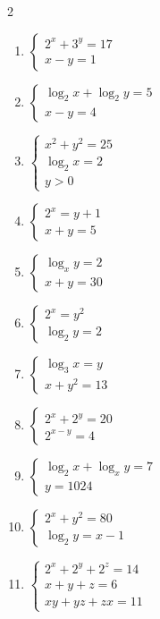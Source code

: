 \documentclass[12pt,a4paper]{article}
\begin{document}
\begin{multicols}{2}
\begin{enumerate}[leftmargin=*, itemsep=6pt]
\item \(\begin{cases}2^x+3^y=17\\ x-y=1\end{cases}\)

\item \(\begin{cases}\log_2x+\log_2y=5\\ x-y=4\end{cases}\)

\item \(\begin{cases}x^2+y^2=25\\ \log_2x=2\\ y>0\end{cases}\)

\item \(\begin{cases}2^x=y+1\\ x+y=5\end{cases}\)

\item \(\begin{cases}\log_xy=2\\ x+y=30\end{cases}\)

\item \(\begin{cases}2^x=y^2\\ \log_2y=2\end{cases}\)

\item \(\begin{cases}\log_3x=y\\ x+y^2=13\end{cases}\)

\item \(\begin{cases}2^x+2^y=20\\ 2^{x-y}=4\end{cases}\)

\item \(\begin{cases}\log_2x+\log_xy=7\\ y=1024\end{cases}\)

\item \(\begin{cases}2^x+y^2=80\\ \log_2y=x-1\end{cases}\)

\item \(\begin{cases}2^x+2^y+2^z=14\\ x+y+z=6\\ xy+yz+zx=11\end{cases}\)

\end{enumerate}
\end{multicols}
\newpage
\end{document}
